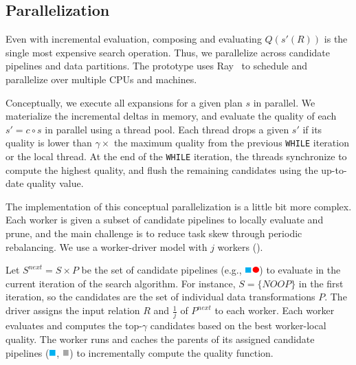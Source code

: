 \subsection{Parallelization} 
Even with incremental evaluation, composing and evaluating $Q(s'(R))$ is the single most expensive search operation.  Thus, we parallelize across candidate pipelines and data partitions. The prototype uses Ray~\cite{ray} to schedule and parallelize  over multiple CPUs and machines.

Conceptually, we execute all expansions for a given plan $s$ in parallel.  We materialize the incremental deltas in memory, and evaluate the quality of each $s' = c\circ s$ in parallel using a thread pool.  Each thread drops a given $s'$ if its quality is lower than $\gamma\times$ the maximum quality from the previous \texttt{WHILE} iteration or the local thread.  At the end of the \texttt{WHILE} iteration, the threads synchronize to compute the highest quality, and flush the remaining candidates using the up-to-date quality value.


The implementation of this conceptual parallelization is a little bit more complex. 
Each worker is given a subset of candidate pipelines to locally evaluate and prune, and the main challenge is to reduce task skew through periodic rebalancing.  We use a worker-driver model with $j$ workers ().

Let $S^{next} = S\times P$ be the set of candidate pipelines (e.g., \includegraphics[height=8pt]{figures/program.pdf}) to evaluate in the current iteration of the search algorithm. For instance, $S=\{NOOP\}$ in the first iteration, so the candidates are the set of individual data transformations $P$.   The driver assigns the input relation $R$ and $\frac{1}{j}$ of $P^{next}$ to each worker.   Each worker evaluates and computes the top-$\gamma$ candidates based on the best worker-local quality.   The worker runs and caches the parents of its assigned candidate pipelines (\includegraphics[height=8pt]{figures/sq-blue.pdf}, \includegraphics[height=8pt]{figures/sq-grey.pdf}) to incrementally compute the quality function.
  
